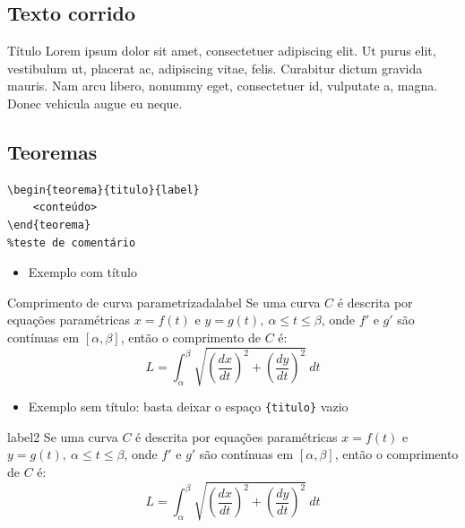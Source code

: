 \subsection{Texto corrido}

\begin{blocks}{Título}
    Lorem ipsum dolor sit amet, consectetuer adipiscing elit. Ut purus elit, vestibulum ut, placerat ac, adipiscing vitae, felis. Curabitur dictum gravida mauris. Nam arcu libero, nonummy eget, consectetuer id, vulputate a, magna. Donec vehicula augue eu neque.
\end{blocks}


\subsection{Teoremas}

\begin{codigo}[H]
\begin{verbatim}
\begin{teorema}{titulo}{label}
    <conteúdo>
\end{teorema}
%teste de comentário
\end{verbatim}
\caption{Código \LaTeX para ambiente \texttt{teorema}. Fonte: Autor.}
\label{cod:ambiente_teorema}
\end{codigo}

\begin{itemize}
    \item Exemplo com título
\end{itemize}
\begin{teorema}{Comprimento de curva parametrizada}{label}
Se uma curva \( C \) é descrita por equações paramétricas \( x=f(t) \) e \( y = g(t),\ \alpha \leq t \leq \beta \), onde \( f' \) e \( g' \) são contínuas em \( \left[ \alpha, \beta \right] \), então o comprimento de \( C \) é:
\[
L = \int_\alpha^\beta \sqrt{\left( \dfrac{dx}{dt} \right)^2 + \left( \dfrac{dy}{dt} \right)^2}\ dt
\]
\end{teorema}

\begin{itemize}
    \item Exemplo sem título: basta deixar o espaço \verb|{titulo}| vazio
\end{itemize}
\begin{teorema}{}{label2}
Se uma curva \( C \) é descrita por equações paramétricas \( x=f(t) \) e \( y = g(t),\ \alpha \leq t \leq \beta \), onde \( f' \) e \( g' \) são contínuas em \( \left[ \alpha, \beta \right] \), então o comprimento de \( C \) é:
\[
L = \int_\alpha^\beta \sqrt{\left( \dfrac{dx}{dt} \right)^2 + \left( \dfrac{dy}{dt} \right)^2}\ dt
\]
\end{teorema}

